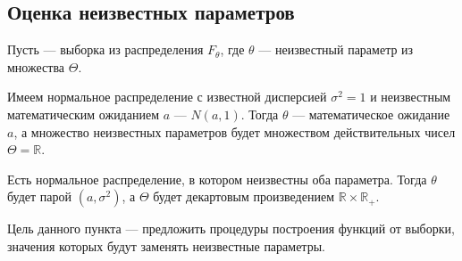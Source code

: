 \begin{comment}
Если устремить количество полуинтервалов к бесконечности ($m\to\infty$),
то каждый полуинтервал будет сжиматься в точку.
При этом вероятность попадания $x$ в отрезок будет стремиться
к вероятности попадания $x$ в точку $y$.
Введём обозначения $|I_j|= \delta$, $I_j= \Delta_y$
$$\probabilityn{x=y}
\approx\probabilityn{x\in\Delta_y}=q_n\left(y\right)\cdot \delta,
\qquad m\to\infty$$

Очень напоминает ситуацию с плотностью распределения
непрерывной случайной величины $\xi$
$$\probability{\xi=x}\approx\pdf{x}\cdot \delta,\qquad\delta\to 0$$

Нужно отметить, что количество элементов выборки
должно стремиться к бесконечности ($n\to\infty$),
так как плотность может быть лишь у непрерывных случайных величин.
Чем больше будет элементов,
тем плотнее они будут стоять на числовой прямой.
\end{comment}
\subsection{Оценка неизвестных параметров}
Пусть \xsample --- выборка из распределения $F_\theta$,
где $\theta$ --- неизвестный параметр из множества $\Theta$.

\begin{example}
  Имеем нормальное распределение с известной дисперсией $\sigma^2 = 1$
  и неизвестным математическим ожиданием $a$ --- $N\left(a,1\right)$.
  Тогда $\theta$ --- математическое ожидание $a$, а множество неизвестных
  параметров будет множеством действительных чисел $\Theta = \mathbb{R}$.
\end{example}
\begin{example}
  Есть нормальное распределение, в котором неизвестны оба параметра.
  Тогда $\theta$ будет парой $\left( a,\sigma^2 \right)$,
  а $\Theta$ будет декартовым произведением $\mathbb{R} \times \mathbb{R_+}$.
\end{example}

Цель данного пункта --- предложить процедуры построения функций от выборки,
значения которых будут заменять неизвестные параметры.

